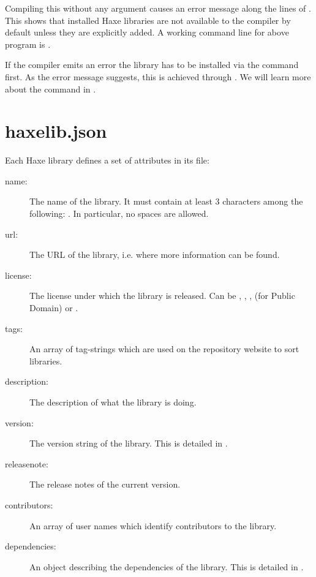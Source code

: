 \documentclass{haxe}
\begin{document}

Compiling this without any  argument causes an error message along the lines of . This shows that installed Haxe libraries are not available to the compiler by default unless they are explicitly added. A working command line for above program is .

If the compiler emits an error  the library has to be installed via the  command first. As the error message suggests, this is achieved through . We will learn more about the  command in .



\section{haxelib.json}
\label{haxelib-json}

Each Haxe library defines a set of attributes in its  file:

\begin{description}
	\item[name:] The name of the library. It must contain at least 3 characters among the following: \ic{\[A-Za-z0-9_-.\]}. In particular, no spaces are allowed.
	\item[url:] The URL of the library, i.e. where more information can be found.
	\item[license:] The license under which the library is released. Can be , , ,  (for Public Domain) or .
	\item[tags:] An array of tag-strings which are used on the repository website to sort libraries.
	\item[description:] The description of what the library is doing.
	\item[version:] The version string of the library. This is detailed in .
	\item[releasenote:] The release notes of the current version.
	\item[contributors:] An array of user names which identify contributors to the library. 
	\item[dependencies:] An object describing the dependencies of the library. This is detailed in .
\end{description}
\end{document}
